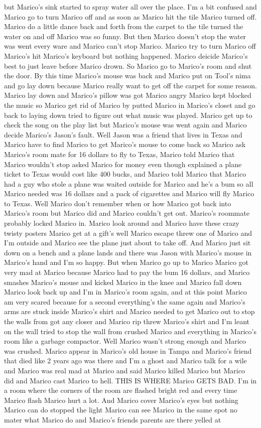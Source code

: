 \documentclass[12pt]{book}
\begin{document}
but Marico's sink started to spray water all over the place. I'm a bit confused and Marico go to turn Marico off and as soon as Marico hit the tile Marico turned off. Marico do a little dance back and forth from the carpet to the tile turned the water on and off Marico was so funny. But then Marico doesn't stop the water was went every ware and Marico can't stop Marico. Marico try to turn Marico off Marico's hit Marico's keyboard but nothing happened. Marico deicide Marico's best to just leave before Marico drown. So Marico go to Marico's room and shut the door. By this time Marico's mouse was back and Marico put on Tool's nima and go lay down because Marico really want to get off the carpet for some reason. Marico lay down and Marico's pillow was got Marico angry Marico kept blocked the music so Marico get rid of Marico by putted Marico in Marico's closet and go back to laying down tried to figure out what music was played. Marico get up to check the song on the play list but Marico's mouse was went again and Marico decide Marico's Jason's fault. Well Jason was a friend that lives in Texas and Marico have to find Marico to get Marico's mouse to come back so Marico ask Marico's room mate for 16 dollars to fly to Texas, Marico told Marico that Marico wouldn't stop asked Marico for money even though explained a plane ticket to Texas would cost like 400 bucks, and Marico told Marico that Marico had a guy who stole a plane was waited outside for Marico and he's a bum so all Marico needed was 16 dollars and a pack of cigarettes and Marico will fly Marico to Texas. Well Marico don't remember when or how Marico got back into Marico's room but Marico did and Marico couldn't get out. Marico's roommate probably locked Marico in. Marico look around and Marico have these crazy twisty posters Marico get at a gift's well Marico escape threw one of Marico and I'm outside and Marico see the plane just about to take off. And Marico just sit down on a bench and a plane lands and there was Jason with Marico's mouse in Marico's hand and I'm so happy. But when Marico go up to Marico Marico got very mad at Marico because Marico had to pay the bum 16 dollars, and Marico smashes Marico's mouse and kicked Marico in the knee and Marico fall down Marico look back up and I'm in Marico's room again, and at this point Marico am very scared because for a second everything's the same again and Marico's arms are stuck inside Marico's shirt and Marico needed to get Marico out to stop the walls from got any closer and Marico rip threw Marico's shirt and I'm leant on the wall tried to stop the wall from crushed Marico and everything in Marico's room like a garbage compactor. Well Marico wasn't strong enough and Marico was crushed. Marico appear in Marico's old house in Tampa and Marico's friend that died like 2 years ago was there and I'm a ghost and Marico talk for a wile and Marico was real mad at Marico and said Marico killed Marico but Marico did and Marico cast Marico to hell. THIS IS WHERE Marico GETS BAD. I'm in a room where the corners of the room are flashed bright red and every time Marico flash Marico hurt a lot. And Marico cover Marico's eyes but nothing Marico can do stopped the light Marico can see Marico in the same spot no mater what Marico do and Marico's friends parents are there yelled at 
\end{document}
